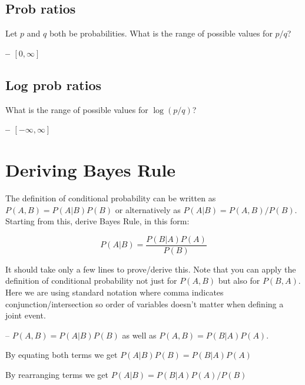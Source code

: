 \documentclass[11pt,letterpaper]{article}
\theoremstyle{definition}
\begin{document}
\subsection{Prob ratios}
Let $p$ and $q$ both be probabilities.
What is the range of possible values for $p/q$?

\textbf{ -- $[0, \infty]$}

\subsection{Log prob ratios}
What is the range of possible values for $\log(p/q)$?

\textbf{ -- $[-\infty, \infty]$}
%
%
%

%
%

\section{Deriving Bayes Rule}

The definition of conditional probability can be written as $P(A,B) = P(A|B)P(B)$ or alternatively as $P(A|B) = P(A,B)/P(B)$.
Starting from this, derive Bayes Rule, in this form:

\[ P(A|B) = \frac{P(B|A) P(A)}{P(B)} \]

\noindent
It should take only a few lines to prove/derive this.  Note that you can apply the definition of conditional probability not just for $P(A,B)$ but also for $P(B,A)$.  Here we are using standard notation where comma indicates conjunction/intersection so order of variables doesn't matter when defining a joint event.

-- $P(A,B) = P(A|B)P(B)$ as well as $P(A,B) = P(B|A)P(A)$.

By equating both terms we get  $P(A|B)P(B) = P(B|A)P(A)$

By rearranging terms we get $P(A|B) = P(B|A)P(A)/P(B)$

%
%
\end{document}
